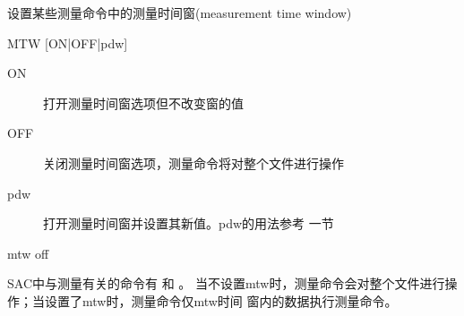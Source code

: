 \label{cmd:mtw}

设置某些测量命令中的测量时间窗(measurement time window)

\begin{SACSTX}
MTW [ON|OFF|pdw]
\end{SACSTX}

\begin{description}
\item [ON] 打开测量时间窗选项但不改变窗的值
\item [OFF] 关闭测量时间窗选项，测量命令将对整个文件进行操作
\item [pdw] 打开测量时间窗并设置其新值。pdw的用法参考  一节
\end{description}

\begin{SACDFT}
mtw off
\end{SACDFT}

SAC中与测量有关的命令有  和  。
当不设置mtw时，测量命令会对整个文件进行操作；当设置了mtw时，测量命令仅mtw时间
窗内的数据执行测量命令。
